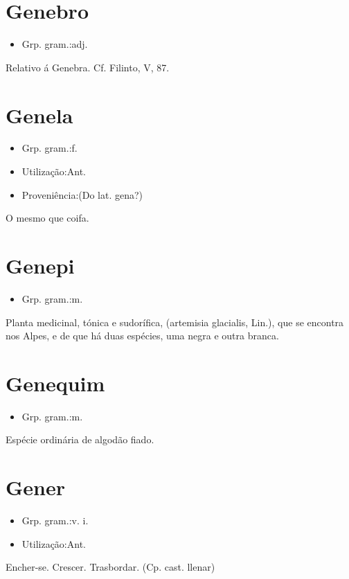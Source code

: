 \section{Genebro}
\begin{itemize}
\item {Grp. gram.:adj.}
\end{itemize}
Relativo á Genebra. Cf. Filinto, V, 87.
\section{Genela}
\begin{itemize}
\item {Grp. gram.:f.}
\end{itemize}
\begin{itemize}
\item {Utilização:Ant.}
\end{itemize}
\begin{itemize}
\item {Proveniência:(Do lat. \textunderscore gena\textunderscore ?)}
\end{itemize}
O mesmo que \textunderscore coifa\textunderscore .
\section{Genepi}
\begin{itemize}
\item {Grp. gram.:m.}
\end{itemize}
Planta medicinal, tónica e sudorífica, (\textunderscore artemisia glacialis\textunderscore , Lin.), que se encontra nos Alpes, e de que há duas espécies, uma negra e outra branca.
\section{Genequim}
\begin{itemize}
\item {Grp. gram.:m.}
\end{itemize}
Espécie ordinária de algodão fiado.
\section{Gener}
\begin{itemize}
\item {Grp. gram.:v. i.}
\end{itemize}
\begin{itemize}
\item {Utilização:Ant.}
\end{itemize}
Encher-se.
Crescer.
Trasbordar.
(Cp. cast. \textunderscore llenar\textunderscore )
